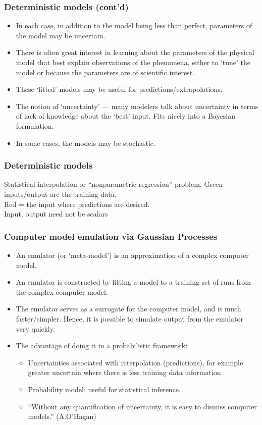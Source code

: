 \documentclass{beamer}
\begin{document}
\begin{frame}
  \frametitle{Deterministic models (cont'd) }
\begin{itemize}
\item In each case, in addition to the model being less than perfect,
  parameters of the model may be uncertain.
\item There is often great interest in learning about the parameters
  of the physical model that best explain observations of the
  phenomena, either to `tune' the model or because the parameters are
  of scientific interest.
\item These `fitted' models may be useful for predictions/extrapolations.
\item The notion of `uncertainty' --- many modelers talk about
  uncertainty in terms of lack of knowledge about the `best'
  input. Fits nicely into a Bayesian formulation.
\item In some cases, the models may be stochastic.
\end{itemize}
\end{frame}

\begin{frame}
  \frametitle{Deterministic models }
Statistical interpolation or ``nonparametric regression'' problem.
\vspace{-0.6in}
Green inputs/output are the training data.\\
Red = the input where predictions are desired.\\
Input, output need not be scalars

\end{frame}

\begin{frame}
  \frametitle{Computer model emulation via Gaussian Processes }
\begin{itemize}
\item An emulator (or `meta-model') is an approximation of a complex
  computer model.
\item An emulator is constructed by fitting a model to a training set
  of runs from the complex computer model.
\item The emulator serves as a surrogate for the computer model, and
  is much faster/simpler. Hence, it is possible to simulate output
  from the emulator very quickly.
\item The advantage of doing it in a probabilistic framework: 
\begin{itemize}
\item Uncertainties associated with interpolation (predictions), for
  example greater uncertain where there is less training data information.
\item Probability model: useful for statistical inference.
\item ``Without any quantification of uncertainty, it is easy to dismiss
  computer models.'' (A.O'Hagan)
\end{itemize}
\end{itemize}
\end{frame}
\end{document}
